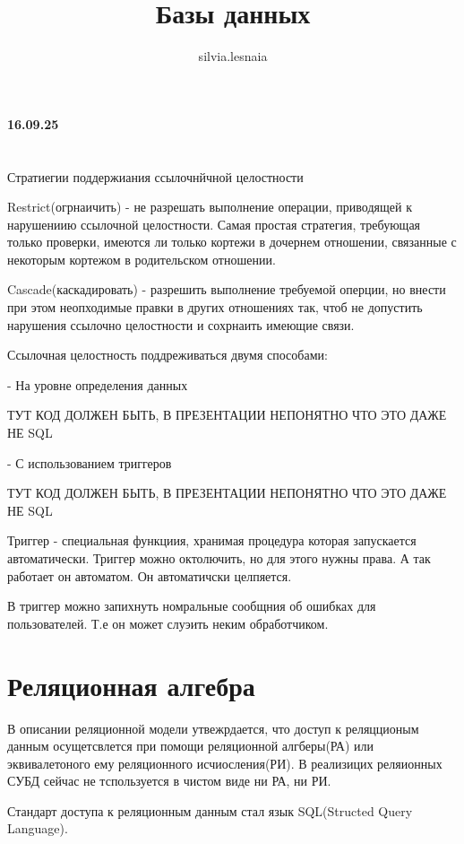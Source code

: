 \documentclass{article}
\title{Базы данных}
\author{silvia.lesnaia }
\begin{document}
\maketitle

\textbf{16.09.25}

\section{}

Стратиегии поддержиания ссылочнйчной целостности

Restrict(огрнаичить) - не разрешать выполнение операции, 
приводящей к нарушениию ссылочной целостности. Самая простая стратегия,
требующая только проверки, имеются ли только кортежи в дочернем отношении, связанные с некоторым 
кортежом в родительском отношении.


Cascade(каскадировать) - разрешить выполнение требуемой оперции, но внести при этом неопходимые правки
в других отношениях так, чтоб не допустить нарушения ссылочно целостности и сохрнаить имеющие связи.

Ссылочная целостность поддреживаться двумя способами:

 - На уровне определения данных 

 ТУТ КОД ДОЛЖЕН БЫТЬ, В ПРЕЗЕНТАЦИИ НЕПОНЯТНО ЧТО ЭТО ДАЖЕ НЕ SQL

 - С использованием триггеров

  ТУТ КОД ДОЛЖЕН БЫТЬ, В ПРЕЗЕНТАЦИИ НЕПОНЯТНО ЧТО ЭТО ДАЖЕ НЕ SQL

Триггер - специальная функциия, хранимая процедура которая запускается автоматически. 
Триггер можно октолючить, но для этого нужны права. А так работает он автоматом. Он автоматичски 
целпяется.

В триггер можно запихнуть номральные сообщния об ошибках для пользователей. Т.е он может 
слуэить неким обработчиком.

\section{Реляционная алгебра}

В описании реляционной модели утвежрдается, что доступ к реляцционым данным осущетсвлется при 
помощи реляционной алгберы(РА) или эквивалетоного ему реляционного исчиосления(РИ). В реализицих 
реляионных СУБД сейчас не тспользуется в чистом виде ни РА, ни РИ.

Стандарт доступа к реляционным данным стал язык SQL(Structed Query Language).
\end{document}
